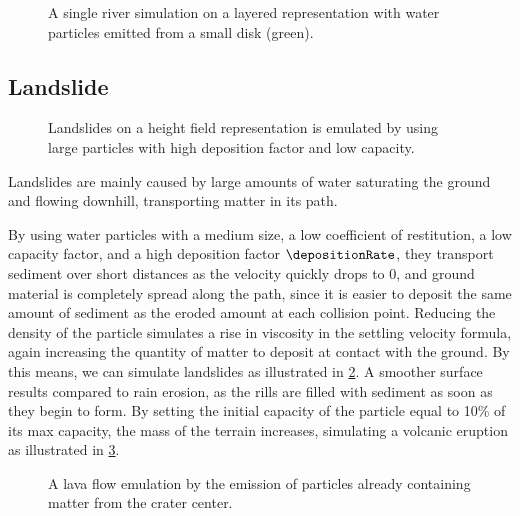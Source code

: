 \begin{figure}[H]
    \caption{A single river simulation on a layered representation with water particles emitted from a small disk (green).}
    \label{fig:erosion-results-river}
\end{figure}

\subsection{Landslide}

\begin{figure}[H]
    \caption{Landslides on a height field representation is emulated by using large particles with high deposition factor and low capacity. }
    \label{fig:erosion-results-landslides}
\end{figure}

Landslides are mainly caused by large amounts of water saturating the ground and flowing downhill, transporting matter in its path.

By using water particles with a medium size, a low coefficient of restitution, a low capacity factor, and a high deposition factor $\depositionRate$, they transport sediment over short distances as the velocity quickly drops to 0, and ground material is completely spread along the path, since it is easier to deposit the same amount of sediment as the eroded amount at each collision point. Reducing the density of the particle simulates a rise in viscosity in the settling velocity formula, again increasing the quantity of matter to deposit at contact with the ground. By this means, we can simulate landslides as illustrated in \cref{fig:erosion-results-landslides}. A smoother surface results compared to rain erosion, as the rills are filled with sediment as soon as they begin to form. %
By setting the initial capacity of the particle equal to 10\% of its max capacity, the mass of the terrain increases, simulating a volcanic eruption as illustrated in \cref{fig:erosion-results-volcano}. %

\begin{figure}[H]
    \caption{A lava flow emulation by the emission of particles already containing matter from the crater center.}
    \label{fig:erosion-results-volcano}
\end{figure}

